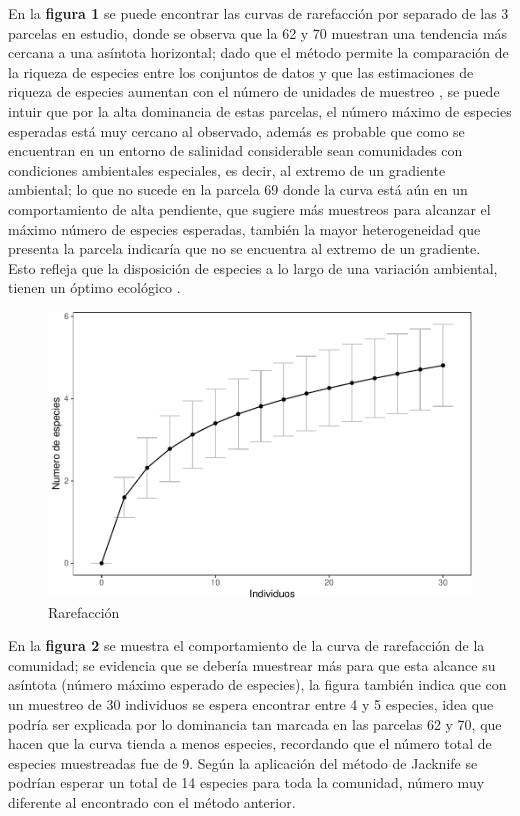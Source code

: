 \documentclass[conference,final,12pt,]{IEEEtran}
\makeatletter
\def\maxwidth{\ifdim\Gin@nat@width>\linewidth\linewidth
\else\Gin@nat@width\fi}
\let\Oldincludegraphics\includegraphics
\renewcommand{\includegraphics}[1]{\Oldincludegraphics[width=\maxwidth]{#1}}
\makeatother
\begin{document}
En la \textbf{figura 1} se puede encontrar las
curvas de rarefacción por separado de las 3 parcelas en estudio, donde
se observa que la 62 y 70 muestran una tendencia más cercana a una
asíntota horizontal; dado que el método permite la comparación de la
riqueza de especies entre los conjuntos de datos \citep{AM} y que las
estimaciones de riqueza de especies aumentan con el número de unidades
de muestreo \citep{AN}, se puede intuir que por la alta dominancia de
estas parcelas, el número máximo de especies esperadas está muy cercano
al observado, además es probable que como se encuentran en un entorno de
salinidad considerable sean comunidades con condiciones ambientales
especiales, es decir, al extremo de un gradiente ambiental; lo que no
sucede en la parcela 69 donde la curva está aún en un comportamiento de
alta pendiente, que sugiere más muestreos para alcanzar el máximo número
de especies esperadas, también la mayor heterogeneidad que presenta la
parcela indicaría que no se encuentra al extremo de un gradiente. Esto
refleja que la disposición de especies a lo largo de una variación
ambiental, tienen un óptimo ecológico \citep{AO}.

\begin{figure}[htb]
\centering
\includegraphics{mangrove_files/figure-latex/unnamed-chunk-6-1.pdf}
\caption{Rarefacción}
\end{figure}

En la \textbf{figura 2} se muestra el comportamiento de la curva de
rarefacción de la comunidad; se evidencia que se debería
muestrear más para que esta alcance su asíntota (número máximo esperado
de especies), la figura también indica que con un muestreo de 30
individuos se espera encontrar entre 4 y 5 especies, idea que podría ser
explicada por lo dominancia tan marcada en las parcelas
62 y 70, que hacen que la curva tienda a menos especies, recordando que
el número total de especies muestreadas fue de 9. Según la aplicación
del método de Jacknife se podrían esperar un total de 14 especies para
toda la comunidad, número muy diferente al encontrado con el
método anterior. 
\end{document}
